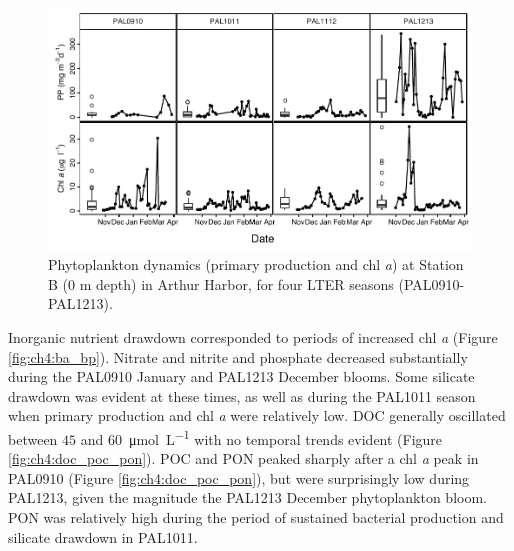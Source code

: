 \begin{figure}[htbp] 
\centering 
\includegraphics[width=1.0\textwidth]{Chapter_5_LTER/Figures/Figure_2_PP_Chl}
\caption[Phytoplankton dynamics (primary production and chl \emph{a}) at Station B  across four LTER seasons (PAL0910-PAL1213).]{Phytoplankton dynamics (primary production and chl \emph{a}) at Station B (0 m depth) in Arthur Harbor, for four LTER seasons (PAL0910-PAL1213).} 
\label{fig:ch4:pp_chl} 
\end{figure}

Inorganic nutrient drawdown corresponded to periods of increased chl \emph{a} (Figure \ref{fig:ch4:ba_bp}). Nitrate and nitrite and phosphate decreased substantially during the PAL0910 January and PAL1213 December blooms. Some silicate drawdown was evident at these times, as well as during the PAL1011 season when primary production and chl \emph{a} were relatively low. DOC generally oscillated between $45$ and \SI{60}{\micro\mole \per\liter} with no temporal trends evident (Figure \ref{fig:ch4:doc_poc_pon}). POC and PON peaked sharply after a chl \emph{a} peak in PAL0910 (Figure \ref{fig:ch4:doc_poc_pon}), but were surprisingly low during PAL1213, given the magnitude the PAL1213 December phytoplankton bloom. PON was relatively high during the period of sustained bacterial production and silicate drawdown in PAL1011. 

